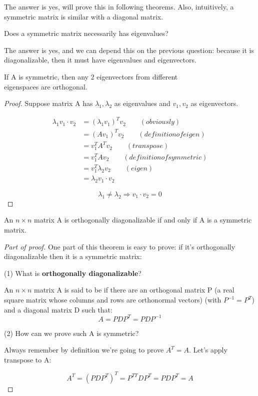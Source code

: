 The answer is yes, will prove this in following theorems. Also, intuitively, a symmetric matrix is similar with a diagonal matrix.

\begin{remark}
    Does a symmetric matrix necessarily has eigenvalues?
\end{remark}

The answer is yes, and we can depend this on the previous question: because it is diagonalizable, then it must have eigenvalues and eigenvectors.

\begin{theorem}
    If A is symmetric, then any 2 eigenvectors from different \\ eigenspaces are orthogonal.
\end{theorem}

\begin{proof}
    Suppose matrix A has $\lambda_1, \lambda_2$ as eigenvalues and $v_1, v_2$ as eigenvectors.

    \begin{align*}
        \lambda_1v_1 \cdot v_2 & = (\lambda_1 v_1)^{T} v_2 \qquad(obviously)\\
        & = (Av_1)^T v_2 \qquad(definition of eigen)  \\
        & = v_1^T A^T v_2 \qquad(transpose) \\
        & = v_1^T A v_2 \qquad(definition of symmetric) \\
        & = v_1^T \lambda_2 v_2 \qquad(eigen) \\
        & = \lambda_2 v_1 \cdot v_2
    \end{align*}

    $$\lambda_1 \neq \lambda_2 \Rightarrow v_1 \cdot v_2 = 0$$
\end{proof}

\begin{theorem}
    An $n \times n$ matrix A is orthogonally diagonalizable if and only if A is a symmetric matrix.
\end{theorem}

\begin{proof}[Part of proof]
One part of this theorem is easy to prove: if it's orthogonally diagonalizable then it is a symmetric matrix:

(1) What is \textbf{orthogonally diagonalizable}?

An $n \times n$ matrix A is said to be  if there are an orthogonal matrix P (a real square matrix whose columns and rows are orthonormal vectors) (with $P^{-1} = P^T$) and a diagonal matrix D such that:
$$A = PDP^T = PDP^{-1}$$

(2) How can we prove such A is symmetric?

Always remember by definition we're going to prove $A^T = A$. Let's apply transpose to A:

$$A^T = (PDP^T)^T = P^{TT}DP^T = PDP^T = A$$
\end{proof}

